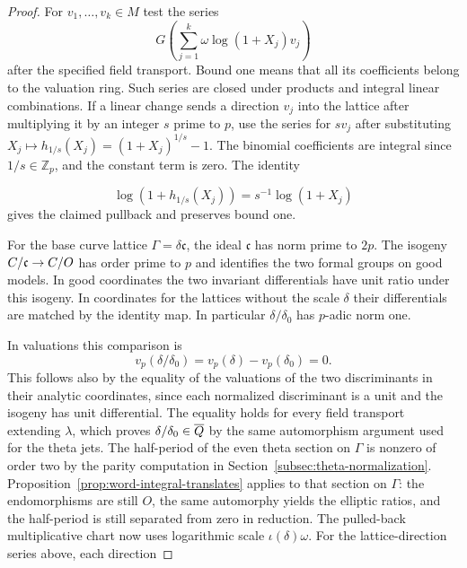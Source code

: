 \begin{proof}

For \(v_1,\ldots,v_k\in M\) test the series
\[
      G\!\left(\sum_{j=1}^k
             \omega\log(1+X_j)v_j\right)
\]
after the specified field transport. Bound one means that
all its coefficients belong to the valuation ring. Such
series are closed under products and integral linear
combinations. If a linear change sends a direction \(v_j\)
into the lattice after multiplying it by an integer \(s\)
prime to \(p\), use the series for \(s v_j\) after substituting
\(X_j\mapsto h_{1/s}(X_j)=(1+X_j)^{1/s}-1\).
The binomial coefficients are integral since \(1/s\in\mathbb Z_p\),
and the constant term is zero. The identity

\[
  \log(1+h_{1/s}(X_j))=s^{-1}\log(1+X_j)
\]
 gives the claimed
pullback and preserves bound one.


For the base curve lattice \(\Gamma=\delta\mathfrak c\),
the ideal \(\mathfrak c\) has norm prime to \(2p\).
The isogeny \(C/\mathfrak c\to C/O\) has order prime to
\(p\) and identifies the two formal groups on good models.
In good coordinates the two invariant differentials have
unit ratio under this isogeny. In coordinates for the
lattices without the scale \(\delta\) their differentials
are matched by the identity map. In particular
\(\delta/\delta_0\) has \(p\)-adic norm one.

In valuations this comparison is
\[
  v_p(\delta/\delta_0)=v_p(\delta)-v_p(\delta_0)=0 .
\]
 This follows
also by the equality of the valuations of the two
discriminants in their analytic coordinates, since each
normalized discriminant is a unit and the isogeny has
unit differential. The equality holds for every field
transport extending \(\lambda\), which proves
\(\delta/\delta_0\in\overline{Q}\) by the same
automorphism argument used for the theta jets.
The half-period of the even theta section on \(\Gamma\)
is nonzero of order two by the parity computation in
Section~\ref{subsec:theta-normalization}.
Proposition~\ref{prop:word-integral-translates} applies to
that section on \(\Gamma\): the endomorphisms are still
\(O\), the same automorphy yields the elliptic ratios,
and the half-period is still separated from zero in
reduction. The pulled-back multiplicative chart now uses
logarithmic scale \(\iota(\delta)\omega\). For the
lattice-direction series above, each direction


\end{proof}
